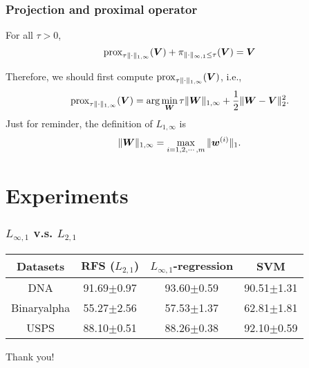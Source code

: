 \documentclass{beamer}
\begin{document}
\begin{frame}[fragile]
    \frametitle{Projection and proximal operator}
    \begin{lemma}
        For all $\tau>0$,
        \begin{equation}
            \mathrm{prox}_{\tau\|\cdot\|_{1,\infty}}({\bm V})+\pi_{\|\cdot\|_{\infty,1}\leq\tau}({\bm V})={\bm V}
        \end{equation}
    \end{lemma}
    Therefore, we should first compute $\mathrm{prox}_{\tau\|\cdot\|_{1,\infty}}({\bm V})$, i.e.,
    \begin{equation}
        \mathrm{prox}_{\tau\|\cdot\|_{1,\infty}}({\bm V})=\arg\min_{{\bm W}}\tau\|{\bm W}\|_{1,\infty}+\frac12\|{\bm W}-{\bm V}\|_2^2.
    \end{equation}
    \vspace{8pt}
    Just for reminder, the definition of $L_{1,\infty}$ is
    \begin{equation}
        \|{\bm W}\|_{1,\infty}=\max_{i=1,2,\cdots,m}\|{\bm w}^{(i)}\|_1.
    \end{equation}
\end{frame}

\section{Experiments}

\begin{frame}[fragile]
    \frametitle{$L_{\infty,1}$ v.s. $L_{2,1}$}
    \scriptsize
    \begin{table}
        \begin{tabular}{cccc}
            \hline\hline
            Datasets    & RFS ($L_{2,1}$) & $L_{\infty,1}$-regression & SVM\\
            \hline
            DNA         & 91.69$\pm$0.97  & 93.60$\pm$0.59 & 90.51$\pm$1.31\\
            \hline
            Binaryalpha & 55.27$\pm$2.56  & 57.53$\pm$1.37 & 62.81$\pm$1.81\\
            \hline
            USPS        & 88.10$\pm$0.51  & 88.26$\pm$0.38 & 92.10$\pm$0.59\\
            \hline\hline
        \end{tabular}
    \end{table}
\end{frame}

\begin{frame}
    \centering
    \Huge{Thank you!}

    \vspace{20pt}
    \scriptsize
    
    
\end{frame}
\end{document}
